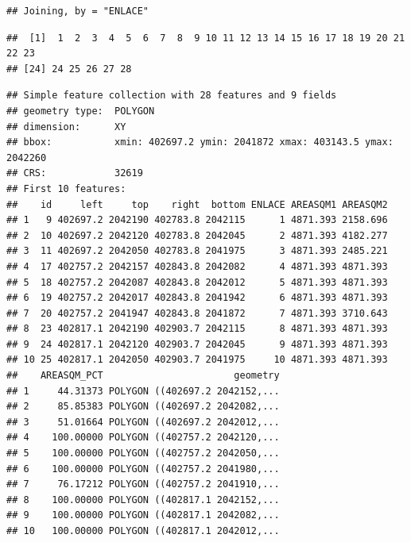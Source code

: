 \documentclass[11pt,]{article}
\newenvironment{Shaded}{\begin{snugshade}}{\end{snugshade}}
\newcommand{\DecValTok}[1]{\textcolor[rgb]{0.00,0.00,0.81}{#1}}
\newcommand{\KeywordTok}[1]{\textcolor[rgb]{0.13,0.29,0.53}{\textbf{#1}}}
\newcommand{\NormalTok}[1]{#1}
\newcommand{\OperatorTok}[1]{\textcolor[rgb]{0.81,0.36,0.00}{\textbf{#1}}}
\newcommand{\StringTok}[1]{\textcolor[rgb]{0.31,0.60,0.02}{#1}}
\begin{document}
\begin{verbatim}
## Joining, by = "ENLACE"
\end{verbatim}

\begin{Shaded}
\end{Shaded}

\begin{verbatim}
##  [1]  1  2  3  4  5  6  7  8  9 10 11 12 13 14 15 16 17 18 19 20 21 22 23
## [24] 24 25 26 27 28
\end{verbatim}

\begin{Shaded}
\end{Shaded}

\begin{verbatim}
## Simple feature collection with 28 features and 9 fields
## geometry type:  POLYGON
## dimension:      XY
## bbox:           xmin: 402697.2 ymin: 2041872 xmax: 403143.5 ymax: 2042260
## CRS:            32619
## First 10 features:
##    id     left     top    right  bottom ENLACE AREASQM1 AREASQM2
## 1   9 402697.2 2042190 402783.8 2042115      1 4871.393 2158.696
## 2  10 402697.2 2042120 402783.8 2042045      2 4871.393 4182.277
## 3  11 402697.2 2042050 402783.8 2041975      3 4871.393 2485.221
## 4  17 402757.2 2042157 402843.8 2042082      4 4871.393 4871.393
## 5  18 402757.2 2042087 402843.8 2042012      5 4871.393 4871.393
## 6  19 402757.2 2042017 402843.8 2041942      6 4871.393 4871.393
## 7  20 402757.2 2041947 402843.8 2041872      7 4871.393 3710.643
## 8  23 402817.1 2042190 402903.7 2042115      8 4871.393 4871.393
## 9  24 402817.1 2042120 402903.7 2042045      9 4871.393 4871.393
## 10 25 402817.1 2042050 402903.7 2041975     10 4871.393 4871.393
##    AREASQM_PCT                       geometry
## 1     44.31373 POLYGON ((402697.2 2042152,...
## 2     85.85383 POLYGON ((402697.2 2042082,...
## 3     51.01664 POLYGON ((402697.2 2042012,...
## 4    100.00000 POLYGON ((402757.2 2042120,...
## 5    100.00000 POLYGON ((402757.2 2042050,...
## 6    100.00000 POLYGON ((402757.2 2041980,...
## 7     76.17212 POLYGON ((402757.2 2041910,...
## 8    100.00000 POLYGON ((402817.1 2042152,...
## 9    100.00000 POLYGON ((402817.1 2042082,...
## 10   100.00000 POLYGON ((402817.1 2042012,...
\end{verbatim}
\end{document}
